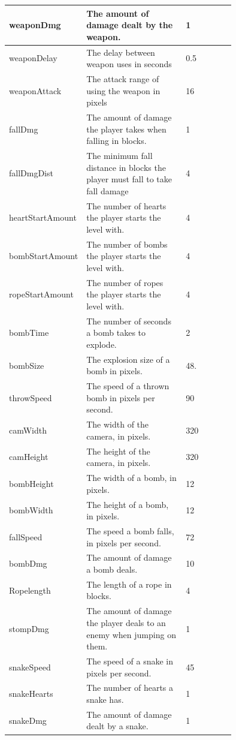 \documentclass[12pt, titlepage]{article}
\begin{document}
\begin{longtable}{|l|p{0.5\linewidth}|p{0.25\linewidth}|}
weaponDmg & The amount of damage dealt by the weapon. & 1\\
\hline
weaponDelay & The delay between weapon uses in seconds & 0.5\\
\hline
weaponAttack & The attack range of using the weapon in pixels & 16\\
\hline

fallDmg & The amount of damage the player takes when falling in blocks. & 1\\
\hline
fallDmgDist & The minimum fall distance in blocks the player must fall to take fall damage & 4\\
\hline

heartStartAmount & The number of hearts the player starts the level with. & 4\\
\hline
bombStartAmount & The number of bombs the player starts the level with. & 4\\
\hline
ropeStartAmount & The number of ropes the player starts the level with. & 4\\
\hline
bombTime & The number of seconds a bomb takes to explode. & 2\\
\hline
bombSize & The explosion size of a bomb in pixels. & 48.\\
\hline
throwSpeed & The speed of a thrown bomb in pixels per second. & 90\\
\hline

camWidth & The width of the camera, in pixels. & 320\\
\hline
camHeight & The height of the camera, in pixels. & 320\\

bombHeight & The width of a bomb, in pixels. & 12\\
\hline
bombWidth & The height of a bomb, in pixels. & 12\\
\hline
fallSpeed & The speed a bomb falls, in pixels per second. & 72\\
\hline
bombDmg & The amount of damage a bomb deals. & 10\\
\hline

Ropelength & The length of a rope in blocks. & 4\\
\hline

stompDmg & The amount of damage the player deals to an enemy when jumping on them. & 1\\
\hline

snakeSpeed & The speed of a snake in pixels per second. & 45\\
\hline
snakeHearts & The number of hearts a snake has. & 1\\
\hline
snakeDmg & The amount of damage dealt by a snake. & 1\\
\hline


\end{longtable}
\end{document}
